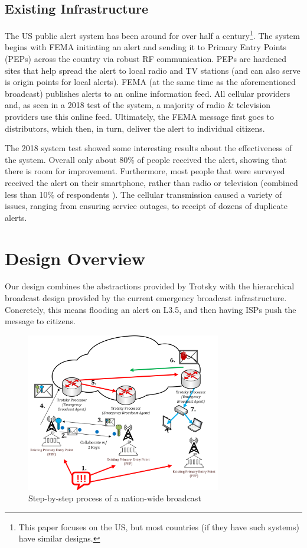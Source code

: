 \subsection{Existing Infrastructure}\label{infrabckgrnd}
The US public alert system has been around for over half a century\footnote{This paper focuses on the US, but most countries (if they have such systems) have similar designs.}. The system begins with FEMA initiating an alert and sending it to Primary Entry Points (PEPs) across the country via robust RF communication. PEPs are hardened sites that help spread the alert to local radio and TV stations (and can also serve is origin points for local alerts). FEMA (at the same time as the aforementioned broadcast) publishes alerts to an online information feed. All cellular providers and, as seen in a 2018 test of the system, a majority of radio \& television providers use this online feed. Ultimately, the FEMA message first goes to distributors, which then, in turn, deliver the alert to individual citizens. \cite{ipaws101}

The 2018 system test showed some interesting results about the effectiveness of the system. Overall only about 80\% of people received the alert, showing that there is room for improvement. Furthermore, most people that were surveyed received the alert on their smartphone, rather than radio or television (combined less than 10\% of respondents ). The cellular transmission caused a variety of issues, ranging from ensuring service outages, to receipt of dozens of duplicate alerts.\cite{weatest,everbridge}

\section{Design Overview}
Our design combines the abstractions provided by Trotsky with the hierarchical broadcast design provided by the current emergency broadcast infrastructure. Concretely, this means flooding an alert on L3.5, and then having ISPs push the message to citizens. 

\begin{figure}[tp]
\centering
\includegraphics[width=8.5cm]{figures/full_diagram_v2.png}
\caption{Step-by-step process of a nation-wide broadcast}
\label{fig:brdcast}
\end{figure}


